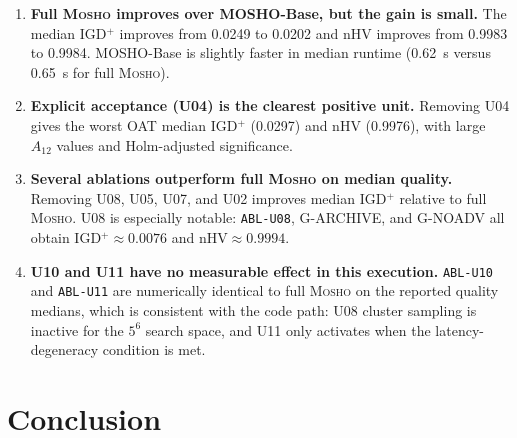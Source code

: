 \documentclass[11pt,a4paper]{article}
\newcommand{\mosho}{\textsc{Mosho}}
\newcommand{\ablof}[1]{\texttt{ABL-#1}}
\begin{document}
\begin{enumerate}[leftmargin=*, nosep, itemsep=6pt]

  \item \textbf{Full \mosho{} improves over MOSHO-Base, but the gain is
  small.}
  The median IGD$^+$ improves from 0.0249 to 0.0202 and nHV improves
  from 0.9983 to 0.9984.  MOSHO-Base is slightly faster in median
  runtime (0.62~s versus 0.65~s for full \mosho{}).

  \item \textbf{Explicit acceptance (U04) is the clearest positive unit.}
  Removing U04 gives the worst OAT median IGD$^+$ (0.0297) and nHV
  (0.9976), with large $A_{12}$ values and Holm-adjusted significance.

  \item \textbf{Several ablations outperform full \mosho{} on median
  quality.}
  Removing U08, U05, U07, and U02 improves median IGD$^+$ relative to
  full \mosho{}.  U08 is especially notable: \ablof{U08}, G-ARCHIVE, and
  G-NOADV all obtain IGD$^+\approx0.0076$ and nHV$\approx0.9994$.

  \item \textbf{U10 and U11 have no measurable effect in this execution.}
  \ablof{U10} and \ablof{U11} are numerically identical to full \mosho{}
  on the reported quality medians, which is consistent with the code path:
  U08 cluster sampling is inactive for the $5^6$ search space, and U11
  only activates when the latency-degeneracy condition is met.

\end{enumerate}


\section{Conclusion}
\end{document}
